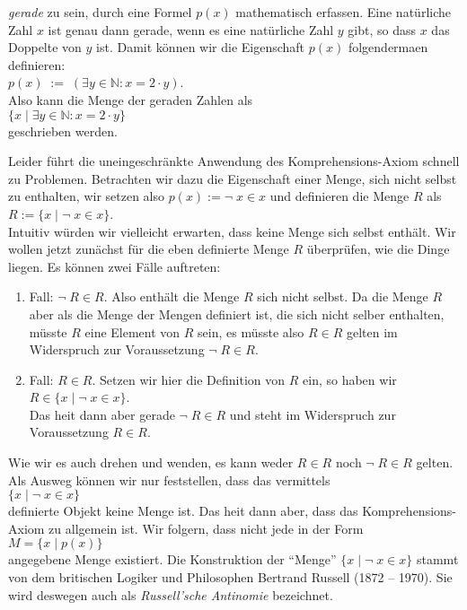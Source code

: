 \emph{gerade} zu sein, durch eine Formel $p(x)$ mathematisch erfassen.  Eine nat\"{u}rliche Zahl $x$ ist
genau dann gerade, wenn es eine nat\"{u}rliche Zahl $y$ gibt, so dass $x$ das Doppelte von $y$
ist.  Damit k\"{o}nnen wir die Eigenschaft $p(x)$ folgenderma\3en
definieren: \\[0.2cm]
\hspace*{1.3cm} $p(x) \;:=\; (\exists y\in \mathbb{N}: x = 2 \cdot y)$. \\[0.2cm]
Also kann die Menge der geraden Zahlen als \\[0.2cm]
\hspace*{1.3cm} $\{ x \;|\; \exists y\in \mathbb{N}: x = 2 \cdot y \}$ \\[0.2cm]
geschrieben werden.

Leider f\"{u}hrt die uneingeschr\"{a}nkte Anwendung des Komprehensions-Axiom schnell zu
Problemen.  Betrachten wir dazu die Eigenschaft einer Menge, sich nicht selbst zu enthalten, wir
setzen also $p(x) := \neg\; x \in x$ und definieren die Menge $R$ als \\[0.2cm]
\hspace*{1.3cm} $R := \{ x \;|\; \neg\; x \in x \}$.  \\[0.2cm]
Intuitiv w\"{u}rden wir vielleicht erwarten, dass keine Menge sich selbst enth\"{a}lt.  Wir wollen
jetzt zun\"{a}chst f\"{u}r die eben definierte Menge $R$ \"{u}berpr\"{u}fen, wie die Dinge liegen.
Es k\"{o}nnen zwei F\"{a}lle auftreten:
\begin{enumerate}
\item Fall: $\neg\; R \in R$. Also enth\"{a}lt die Menge $R$ sich nicht selbst.
      Da die Menge $R$ aber als die Menge der Mengen definiert ist, die sich nicht selber
      enthalten, m\"{u}sste $R$ eine Element von $R$ sein, es m\"{u}sste also
      $R \in R$ gelten im Widerspruch zur Voraussetzung $\neg\; R \in R$.
\item Fall: $R \in R$. Setzen wir hier die Definition von $R$ ein, so haben wir \\[0.2cm]
      \hspace*{1.3cm}  $R \in \{ x \;|\; \neg\; x \in x \}$. \\[0.2cm]
      Das hei\3t dann aber gerade $\neg\; R \in R$ und steht im Widerspruch zur
      Voraussetzung $R \in R$.
\end{enumerate}
Wie wir es auch drehen und wenden, es kann weder $R \in R$ noch $\neg\; R \in R$ gelten. 
Als Ausweg k\"{o}nnen wir nur feststellen, dass das vermittels \\[0.2cm]
\hspace*{1.3cm} $\{ x \mid \neg\; x \in x \}$ \\[0.2cm]
definierte Objekt keine Menge ist.
Das hei\3t dann aber, dass das Komprehensions-Axiom
zu allgemein ist.  Wir folgern, dass nicht jede  in der Form \\[0.2cm]
\hspace*{1.3cm} $M = \{ x \mid p(x) \}$ \\[0.2cm]
angegebene Menge  existiert.  Die Konstruktion der ``Menge''
$\{x \mid \neg\; x \in x\}$ stammt von dem britischen Logiker und Philosophen Bertrand
Russell (1872 -- 1970).  Sie wird deswegen auch als \emph{Russell'sche Antinomie} bezeichnet.


